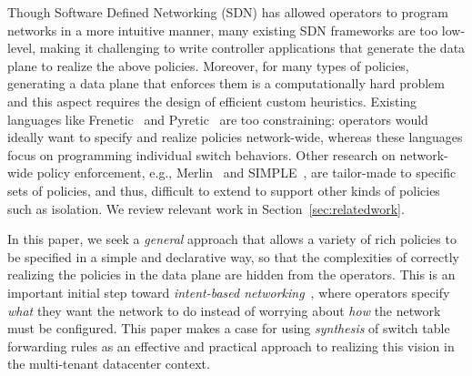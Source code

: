 Though Software Defined Networking (SDN) has allowed operators
to program networks in a more intuitive manner, many existing SDN
frameworks are too low-level, making it challenging
to write controller applications that generate the
data plane to realize the above policies. %
Moreover, for many types of
  policies, generating a data plane 
  that enforces them is a
computationally hard problem and
this aspect requires the design of efficient custom heuristics.
Existing
languages like Frenetic~\cite{frenetic} and Pyretic~\cite{pyretic} are
too constraining: operators would ideally want to specify
and realize policies network-wide, whereas these languages focus on
programming individual switch behaviors. %
Other research on network-wide policy enforcement, e.g.,
Merlin~\cite{merlin} and SIMPLE~\cite{simple}, are tailor-made to
specific sets of policies, and thus, difficult to extend to support
other kinds of policies such as isolation. We review relevant work in
Section~\ref{sec:relatedwork}.


In this paper, we seek a {\em general} approach that allows a variety
of rich policies to be specified in a simple and declarative way, so
that the complexities of correctly realizing the policies in the data
plane are hidden from the operators. This is an important
initial step toward {\em intent-based networking}~\cite{intent}, where
operators specify {\em what} they want the network to do instead of
worrying about {\em how} the network must be configured.
This paper makes a case for using \emph{synthesis} of switch table
forwarding rules as an effective and practical approach to realizing
this vision in the multi-tenant datacenter context.

